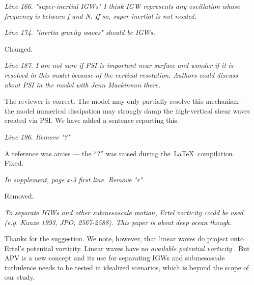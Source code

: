 \documentclass[11pt]{article}
\newcommand{\bdp}{\begin{description}}
\newcommand{\edp}{\end{description}}
\begin{document}
\begin{enumerate}

\item {\it Line 166. "super-inertial IGWs" I think IGW represents any oscillation whose
                frequency is between f and N. If so, super-inertial is not needed.}

\bdp
  \item  {}
\edp

\item {\it Line 174. "inertia gravity waves" should be IGWs.}

\bdp
   \item Changed.
\edp

\item {\it Line 187. I am not sure if PSI is important near surface and wonder if it
                is resolved in this model because of the vertical resolution.
                Authors could discuss about PSI in the model with Jenn Mackinnon there.}

\bdp
  \item The reviewer is correct. The model may only partially resolve this mechanism ---
        the model numerical dissipation may strongly damp the high-vertical shear
        waves created via PSI. We have added a sentence reporting this.
\edp

\item {\it Line 196. Remove "?"}

\bdp
  \item A reference  was amiss --- the ``?'' was raised during the\, \LaTeX\, compilation. Fixed.
\edp

\item {\it In supplement, page x-3 first line. Remove "r"}

\bdp
  \item Removed.
\edp

\item {\it To separate IGWs and other submesoscale motion, Ertel vorticity could be
      used (e.g. Kunze 1993, JPO, 2567-2588). This paper is about deep ocean though.}

      \bdp
        \item {\noindent Thanks for the suggestion. We note, however, that linear waves do
        project onto Ertel's potential vorticity. Linear waves have no \textit{available potential vorticity}
        \citep[APV, ][]{wagner_young2015}. But APV is a new concept and its use
        for separating IGWs and submesoscale turbulence needs to be tested in idealized
        scenarios, which is beyond the scope of our study.}
      \edp


\end{enumerate}
\end{document}
